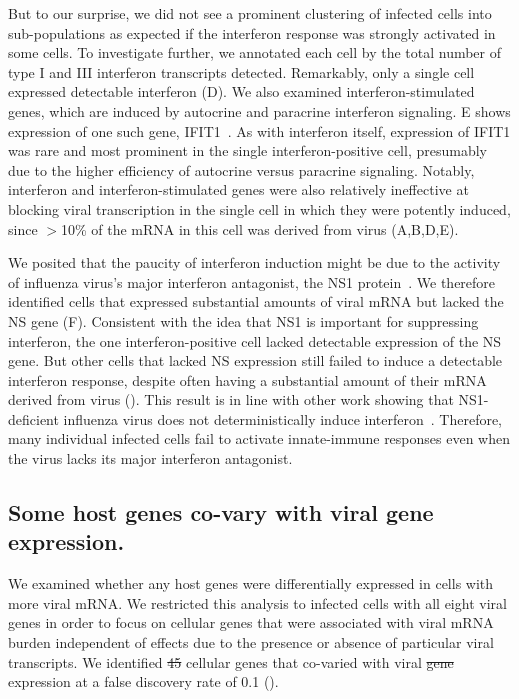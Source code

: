 \documentclass[9pt,lineno]{elife}
\providecommand{\DIFadd}[1]{{\protect\color{blue}\uwave{#1}}} %
\providecommand{\DIFdel}[1]{{\protect\color{red}\sout{#1}}}                      %
\providecommand{\DIFaddbegin}{} %
\providecommand{\DIFaddend}{} %
\providecommand{\DIFdelbegin}{} %
\providecommand{\DIFdelend}{} %
\begin{document}
But to our surprise, we did not see a prominent clustering of infected cells into sub-populations as expected if the interferon response was strongly activated in some cells.
To investigate further, we annotated each cell by the total number of type I and III interferon transcripts detected.
Remarkably, only a single cell expressed detectable interferon (D).
We also examined interferon-stimulated genes, which are induced by autocrine and paracrine interferon signaling.
E shows expression of one such gene, IFIT1~\citep{Fensterl:2011fp}.
As with interferon itself, expression of IFIT1 was rare and most prominent in the single interferon-positive cell, presumably due to the higher efficiency of autocrine versus paracrine signaling.
Notably, interferon and interferon-stimulated genes were also relatively ineffective at blocking viral transcription in the single cell in which they were potently induced, since $>$10\% of the mRNA in this cell was derived from virus (A,B,D,E).

We posited that the paucity of interferon induction might be due to the activity of influenza virus's major interferon antagonist, the NS1 protein~\citep{garcia1998influenza,hale2008multifunctional}.
We therefore identified cells that expressed substantial amounts of viral mRNA but lacked the NS gene (F).
Consistent with the idea that NS1 is important for suppressing interferon, the one interferon-positive cell lacked detectable expression of the NS gene.
But other cells that lacked NS expression still failed to induce a detectable interferon response, despite often having a substantial amount of their mRNA derived from virus ().
This result is in line with other work showing that NS1-deficient influenza virus does not deterministically induce interferon~\citep{Killip:2017ef,Kallfass:2013kp}.
Therefore, many individual infected cells fail to activate innate-immune responses even when the virus lacks its major interferon antagonist.

\subsection{Some host genes co-vary with viral gene expression.}
We examined whether any host genes were differentially expressed in cells with more viral mRNA.
We restricted this analysis to infected cells with all eight viral genes in order to focus on cellular genes that were associated with viral mRNA burden independent of effects due to the presence or absence of particular viral transcripts.
We identified \DIFdelbegin \DIFdel{45 }\DIFdelend \DIFaddbegin \DIFadd{43 }\DIFaddend cellular genes that co-varied with viral \DIFdelbegin \DIFdel{gene }\DIFdelend \DIFaddbegin \DIFadd{mRNA }\DIFaddend expression at a false discovery rate of 0.1 (\FIG{cellulargenes}\DIFaddbegin \DIFadd{, }\FIG{cellulargenes}\DIFadd{-source~data~\ref{figdata:cellulargenes}}\DIFaddend ).
\end{document}
